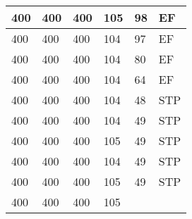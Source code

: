 \begin{table}[]
\begin{tabular}{lllll|l|}
400                                 & 400                                & 400                                & 105                                & 
98                                 & EF                                    \\ \hline
400                                 & 400                                & 400                                & 104                                & 
97                                 & EF                                    \\ \hline
400                                 & 400                                & 400                                & 104                                & 
80                                 & EF                                    \\ \hline
400                                 & 400                                & 400                                & 104                                & 
64                                 & EF                                    \\ \hline
400                                 & 400                                & 400                                & 104                                & 
48                                 & STP                                   \\ \hline
400                                 & 400                                & 400                                & 104                                & 
49                                 & STP                                   \\ \hline
400                                 & 400                                & 400                                & 105                                & 
49                                 & STP                                   \\ \hline
400                                 & 400                                & 400                                & 104                                & 
49                                 & STP                                   \\ \hline
400                                 & 400                                & 400                                & 105                                & 
49                                 & STP                                   \\ \hline
400                                 & 400                                & 400                                & 105                                & 

\end{tabular}
\end{table}
